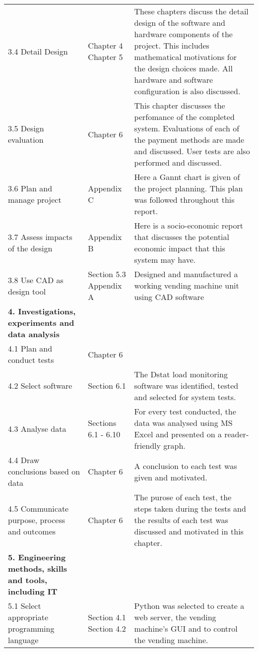 \begin{longtable}{|p{5.9cm}|p{2.2cm}|p{5.5cm}|}
3.4 Detail Design & Chapter 4
Chapter 5 & These chapters discuss the detail design of the software and hardware components of the project. This includes mathematical motivations for the  design choices made.  All hardware and software configuration is also discussed. \\

3.5 Design evaluation &  Chapter 6 & This chapter discusses the perfomance of the completed system. Evaluations of each of the payment methods are made and discussed. User tests are also performed and discussed. \\

3.6 Plan and manage project & Appendix C & Here a Gannt chart is given of the project planning. This plan was followed throughout this report. \\

3.7 Assess impacts of the design & Appendix B & Here is a socio-economic report that discusses the potential economic impact that this system may have.  \\

3.8 Use CAD as design tool & Section 5.3
Appendix A & Designed and manufactured a working vending machine unit using CAD software \\
\hline
{\bf 4. Investigations, experiments and data analysis} &            &            \\
4.1 Plan and conduct tests &  Chapter 6 &            \\

4.2 Select software & Section 6.1 & The Dstat load monitoring software was identified, tested and selected for system tests. \\
\hline
4.3 Analyse data & Sections 6.1 - 6.10 & For every test conducted, the data was analysed using MS Excel and presented on a reader-friendly graph.   \\

4.4 Draw conclusions based on data &  Chapter 6 & A conclusion to each test was given and motivated. \\

4.5 Communicate purpose, process and outcomes &  Chapter 6 & The purose of each test, the steps taken during the tests and the results of each test was discussed and motivated in this chapter.  \\
\hline
{\bf 5. Engineering methods, skills and tools, including IT} &            &            \\
5.1 Select appropriate programming language & Section 4.1
Section 4.2 & Python was selected to create a web server, the vending machine's GUI and to control the vending machine. \\


\end{longtable}

